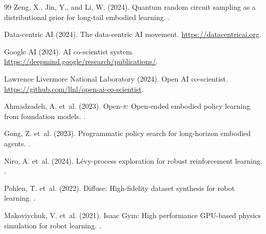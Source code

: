 \documentclass[10pt]{article}
\begin{document}
\begin{thebibliography}{99}
Zeng, X., Jin, Y., and Li, W. (2024).
\newblock Quantum random circuit sampling as a distributional prior for
  long-tail embodied learning.
.

Data-centric AI (2024).
\newblock The data-centric AI movement.
\newblock \url{https://datacentricai.org}.

Google AI (2024).
\newblock AI co-scientist system.
\newblock \url{https://deepmind.google/research/publications/}.

Lawrence Livermore National Laboratory (2024).
\newblock Open AI co-scientist.
\newblock \url{https://github.com/llnl/open-ai-co-scientist}.

Ahmadzadeh, A. et~al. (2023).
\newblock Open-$\pi$: Open-ended embodied policy learning from foundation models.
.

Gong, Z. et~al. (2023).
\newblock Programmatic policy search for long-horizon embodied agents.
.

Niro, A. et~al. (2024).
\newblock L\'evy-process exploration for robust reinforcement learning.
.

Pohlen, T. et~al. (2022).
\newblock Diffuse: High-fidelity dataset synthesis for robot learning.
.

Makoviychuk, V. et~al. (2021).
\newblock Isaac Gym: High performance GPU-based physics simulation for robot learning.
.

\end{thebibliography}
\end{document}
